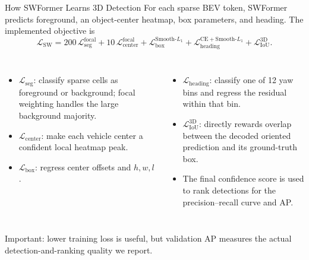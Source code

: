 \documentclass[aspectratio=169,10pt]{beamer}
\begin{document}
\begin{frame}{How SWFormer Learns 3D Detection}
\small
For each sparse BEV token, SWFormer predicts foreground, an object-center
heatmap, box parameters, and heading. The implemented objective is
\[
\mathcal{L}_{\mathrm{SW}}=
200\,\mathcal{L}_{\mathrm{seg}}^{\mathrm{focal}}+
10\,\mathcal{L}_{\mathrm{center}}^{\mathrm{focal}}+
\mathcal{L}_{\mathrm{box}}^{\mathrm{Smooth}\text{-}L_1}+
\mathcal{L}_{\mathrm{heading}}^{\mathrm{CE}+\mathrm{Smooth}\text{-}L_1}+
\mathcal{L}_{\mathrm{IoU}}^{3\mathrm{D}}.
\]

\begin{columns}[T,onlytextwidth]
\begin{itemize}\setlength{\itemsep}{4pt}
  \item $\mathcal{L}_{\mathrm{seg}}$: classify sparse cells as foreground or
  background; focal weighting handles the large background majority.
  \item $\mathcal{L}_{\mathrm{center}}$: make each vehicle center a confident
  local heatmap peak.
  \item $\mathcal{L}_{\mathrm{box}}$: regress center offsets and $h,w,l$.
\end{itemize}

\begin{itemize}\setlength{\itemsep}{4pt}
  \item $\mathcal{L}_{\mathrm{heading}}$: classify one of 12 yaw bins and
  regress the residual within that bin.
  \item $\mathcal{L}_{\mathrm{IoU}}^{3\mathrm{D}}$: directly rewards overlap
  between the decoded oriented prediction and its ground-truth box.
  \item The final confidence score is used to rank detections for the
  precision--recall curve and AP.
\end{itemize}
\end{columns}

\vspace{2mm}
\centering\footnotesize
\alert{Important:} lower training loss is useful, but validation AP measures
the actual detection-and-ranking quality we report.
\end{frame}
\end{document}
